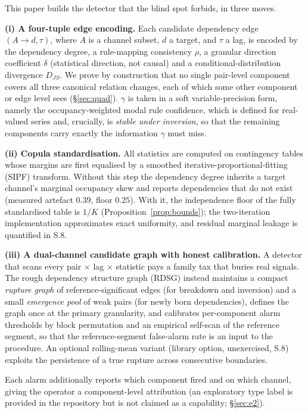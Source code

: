 \documentclass[11pt,a4paper]{article}
\newcommand{\RDSG}{RDSG}
\begin{document}
This paper builds the detector that the blind spot forbids, in three moves.

\textbf{(i) A four-tuple edge encoding.} Each candidate dependency edge
$(A\!\to\! d,\tau)$, where $A$ is a channel subset, $d$ a target, and $\tau$ a lag,
is encoded by the dependency degree, a rule-mapping consistency $\rho$, a granular
direction coefficient $\delta$ (statistical direction, not causal) and a
conditional-distribution divergence
$D_{JS}$. We prove by construction that no single pair-level component covers all
three canonical relation changes, each of which some other component or
edge level sees (\S\ref{sec:quad}). $\gamma$ is
taken in a soft variable-precision form, namely the occupancy-weighted modal rule
confidence, which is defined for real-valued series and, crucially, is
\emph{stable under inversion}, so that the remaining components carry exactly
the information $\gamma$ must miss.

\textbf{(ii) Copula standardisation.} All statistics are computed on
contingency tables whose margins are first equalised by a smoothed
iterative-proportional-fitting (SIPF) transform. Without this step the dependency
degree inherits a target channel's marginal occupancy skew and reports
dependencies that do not exist (measured artefact $0.39$, floor $0.25$). With it, the independence floor of the fully standardised table is
$1/K$ (Proposition~\ref{prop:bounds}); the two-iteration implementation
approximates exact uniformity, and residual marginal leakage is
quantified in S.8.

\textbf{(iii) A dual-channel candidate graph with honest calibration.} A
detector that scans every pair $\times$ lag $\times$ statistic pays a family
tax that buries real signals. The rough dependency structure graph
(\RDSG{}) instead maintains a compact
\emph{rupture graph} of reference-significant edges (for breakdown and
inversion) and a small \emph{emergence pool} of weak pairs (for newly born
dependencies), defines the graph once at the primary granularity, and
calibrates per-component alarm thresholds by block permutation
\citep{kunsch1989} and an empirical self-scan of the reference segment, so
that the reference-segment false-alarm rate is an input to the procedure. An optional
rolling-mean variant (library option, unexercised, S.8) exploits the
persistence of a true rupture across consecutive boundaries.

Each alarm additionally reports which component fired and on which channel,
giving the operator a component-level attribution (an exploratory type label
is provided in the repository but is not claimed as a capability; \S\ref{sec:e2}).
\end{document}
